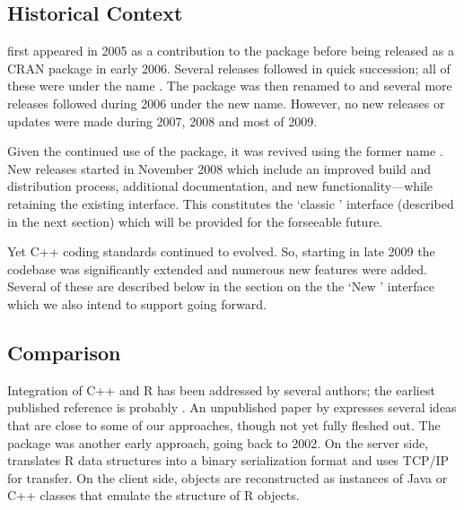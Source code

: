 \subsection{Historical Context}

 first appeared in 2005 as a contribution to the 
package \citep{eddelbuettelkhan09:rquantlib} before being released as a CRAN
package in early 2006. Several releases followed in quick succession; all of
these were under the name . The package was then renamed to
 and several more releases followed during 2006 under the
new name.  However, no new releases or updates were made during 2007, 2008
and most of 2009.

Given the continued use of the package, it was revived using the former name
. New releases started in November 2008 which include an improved
build and distribution process, additional documentation, and new
functionality---while retaining the existing interface.  This constitutes the
`classic ' interface (described in the next section)
which will be provided for the forseeable future.

Yet C++ coding standards continued to evolved. So, starting in late 2009 the
codebase was significantly extended and numerous new features were added.
Several of these are described below in the section on the the `New
' interface which we also intend to support going forward.

\subsection{Comparison}

Integration of C++ and R has been addressed by several authors; the earliest
published reference is probably \cite{batesdebroy01:cppclasses}.
An unpublished paper by \cite{javagailemanly07:r_cpp} expresses several ideas
that are close to some of our approaches, though not yet fully fleshed out.
%
The  package \citep{cran:Rserve} was another early approach,
going back to 2002. On the server side,  translates R data
structures into a binary serialization format and uses TCP/IP for
transfer. On the client side, objects are reconstructed as instances of Java
or C++ classes that emulate the structure of R objects. 

